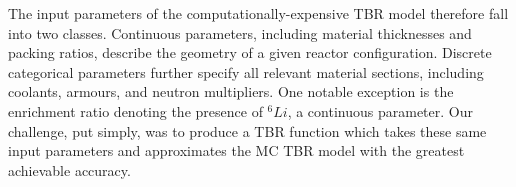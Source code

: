 The input parameters of the computationally-expensive TBR model therefore fall into two classes. Continuous parameters, including material thicknesses and packing ratios, describe the geometry of a given reactor configuration. Discrete categorical parameters further specify all relevant material sections, including coolants, armours, and neutron multipliers. One notable exception is the enrichment ratio denoting the presence of $^6Li$, a continuous parameter. Our challenge, put simply, was to produce a TBR function which takes these same input parameters and approximates the MC TBR model with the greatest achievable accuracy.
    



